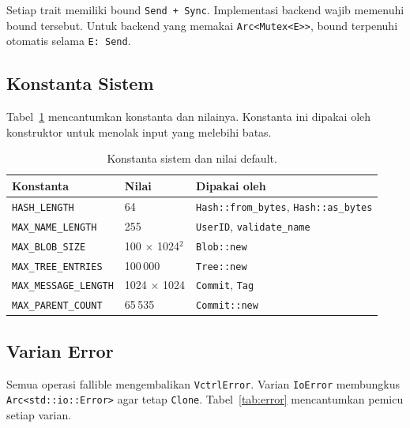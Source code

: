 \documentclass[11pt,a4paper]{article}
\begin{document}
Setiap trait memiliki bound \texttt{Send + Sync}. Implementasi backend wajib memenuhi bound tersebut. Untuk backend yang memakai \texttt{Arc<Mutex<E>>}, bound terpenuhi otomatis selama \texttt{E: Send}.

\subsection{Konstanta Sistem}

Tabel~\ref{tab:konstanta} mencantumkan konstanta dan nilainya. Konstanta ini dipakai oleh konstruktor untuk menolak input yang melebihi batas.

\begin{table}[H]
	\centering
	\caption{Konstanta sistem dan nilai default.}
	\label{tab:konstanta}
	\footnotesize
	\begin{tabularx}{\textwidth}{l l X}
		\toprule
		Konstanta & Nilai & Dipakai oleh \\
		\midrule
		\texttt{HASH\_LENGTH} & 64 & \texttt{Hash::from\_bytes}, \texttt{Hash::as\_bytes} \\
		\texttt{MAX\_NAME\_LENGTH} & 255 & \texttt{UserID}, \texttt{validate\_name} \\
		\texttt{MAX\_BLOB\_SIZE} & 100 $\times$ 1024$^2$ & \texttt{Blob::new} \\
		\texttt{MAX\_TREE\_ENTRIES} & 100\,000 & \texttt{Tree::new} \\
		\texttt{MAX\_MESSAGE\_LENGTH} & 1024 $\times$ 1024 & \texttt{Commit}, \texttt{Tag} \\
		\texttt{MAX\_PARENT\_COUNT} & 65\,535 & \texttt{Commit::new} \\
		\bottomrule
	\end{tabularx}
\end{table}

\subsection{Varian Error}

Semua operasi fallible mengembalikan \texttt{VctrlError}. Varian \texttt{IoError} membungkus \texttt{Arc<std::io::Error>} agar tetap \texttt{Clone}. Tabel~\ref{tab:error} mencantumkan pemicu setiap varian.
\end{document}
